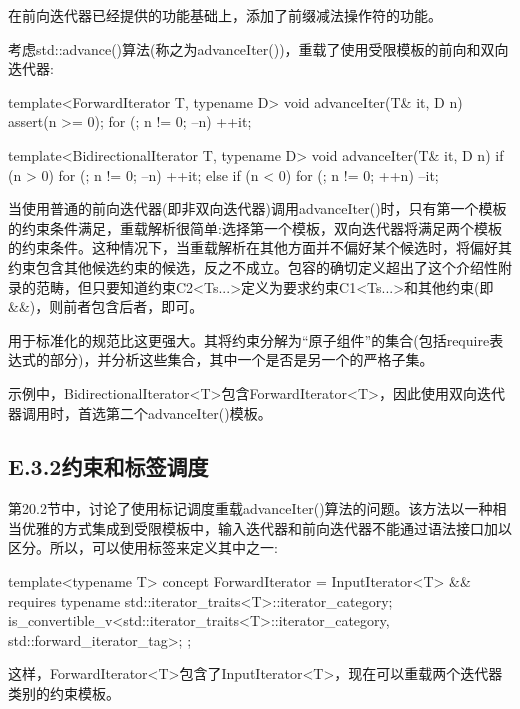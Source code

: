在前向迭代器已经提供的功能基础上，添加了前缀减法操作符的功能。

考虑std::advance()算法(称之为advanceIter())，重载了使用受限模板的前向和双向迭代器:

\begin{cpp}
template<ForwardIterator T, typename D>
void advanceIter(T& it, D n)
{
	assert(n >= 0);
	for (; n != 0; --n) { ++it; }
}

template<BidirectionalIterator T, typename D>
void advanceIter(T& it, D n)
{
	if (n > 0) {
		for (; n != 0; --n) { ++it; }
	} else if (n < 0) {
		for (; n != 0; ++n) { --it; }
	}
}
\end{cpp}

当使用普通的前向迭代器(即非双向迭代器)调用advanceIter()时，只有第一个模板的约束条件满足，重载解析很简单:选择第一个模板，双向迭代器将满足两个模板的约束条件。这种情况下，当重载解析在其他方面并不偏好某个候选时，将偏好其约束包含其他候选约束的候选，反之不成立。包容的确切定义超出了这个介绍性附录的范畴，但只要知道约束C2<Ts...>定义为要求约束C1<Ts...>和其他约束(即\&\&)，则前者包含后者，即可。

\begin{notice}用于标准化的规范比这更强大。其将约束分解为“原子组件”的集合(包括require表达式的部分)，并分析这些集合，其中一个是否是另一个的严格子集。
\end{notice}

示例中，BidirectionalIterator<T>包含ForwardIterator<T>，因此使用双向迭代器调用时，首选第二个advanceIter()模板。

\subsection{E.3.2\hspace{0.2cm}约束和标签调度}

第20.2节中，讨论了使用标记调度重载advanceIter()算法的问题。该方法以一种相当优雅的方式集成到受限模板中，输入迭代器和前向迭代器不能通过语法接口加以区分。所以，可以使用标签来定义其中之一:

\begin{cpp}
template<typename T>
concept ForwardIterator =
InputIterator<T> &&
requires {
	typename std::iterator_traits<T>::iterator_category;
	is_convertible_v<std::iterator_traits<T>::iterator_category,
					std::forward_iterator_tag>;
};
\end{cpp}

这样，ForwardIterator<T>包含了InputIterator<T>，现在可以重载两个迭代器类别的约束模板。





















